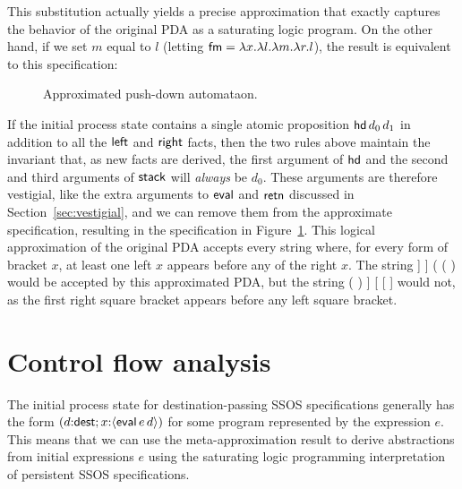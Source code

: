 \smallskip
{}
\smallskip

\noindent This substitution actually yields a precise approximation
that exactly captures the behavior of the original PDA as a saturating
logic program. On the other hand, if we set $m$ equal to $l$ 
(letting ${\sf fm} = \lambda x. \lambda l. \lambda m. \lambda r. l$), 
the result is equivalent to this specification:

\smallskip
{}
\smallskip

\begin{figure}
\caption{Approximated push-down automataon.}
\label{fig:pda-pers-approx2}
\end{figure}

If the initial process state contains a single atomic proposition
${\sf hd}\,d_0\,d_1$ in addition to all the ${\sf left}$ and ${\sf
  right}$ facts, then the two rules above maintain the invariant that,
as new facts are derived, the first argument of ${\sf hd}$ and the
second and third arguments of ${\sf stack}$ will {\it always} be
$d_0$.  These arguments are therefore vestigial, like the extra
arguments to ${\sf eval}$ and ${\sf retn}$ discussed in
Section~\ref{sec:vestigial}, and we can remove them from the
approximate specification, resulting in the specification in
Figure~\ref{fig:pda-pers-approx2}. This logical approximation of the
original PDA accepts every string where, for every form of bracket
$x$, at least one left $x$ appears before any of the right $x$. The
string {\sf [ ] ] ] ( ( )} would be accepted by this approximated PDA,
but the string {\sf ( ) ] [ [ ]} would not, as the first right square
bracket appears before any left square bracket.


\section{Control flow analysis}
\label{sec:0cfa}

The initial process state for destination-passing SSOS specifications
generally has the form $(d{:}{\sf dest}; x{:}\langle {{\sf eval}\,e\,d} \rangle)$
for some program represented by the expression $e$. This means that we
can use the meta-approximation result to derive abstractions from
initial expressions $e$ using the saturating logic programming
interpretation of persistent SSOS specifications.

